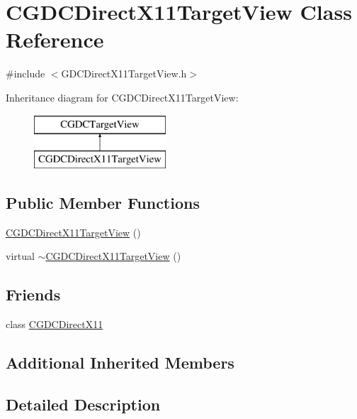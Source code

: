 \hypertarget{class_c_g_d_c_direct_x11_target_view}{}\section{C\+G\+D\+C\+Direct\+X11\+Target\+View Class Reference}
\label{class_c_g_d_c_direct_x11_target_view}


{\ttfamily \#include $<$G\+D\+C\+Direct\+X11\+Target\+View.\+h$>$}

Inheritance diagram for C\+G\+D\+C\+Direct\+X11\+Target\+View\+:\begin{figure}[H]
\begin{center}
\leavevmode
\includegraphics[height=2.000000cm]{class_c_g_d_c_direct_x11_target_view}
\end{center}
\end{figure}
\subsection*{Public Member Functions}
\begin{DoxyCompactItemize}
\item 
\hyperlink{class_c_g_d_c_direct_x11_target_view_abee235fd318db9172f3efd392e84f6eb}{C\+G\+D\+C\+Direct\+X11\+Target\+View} ()
\item 
virtual \hyperlink{class_c_g_d_c_direct_x11_target_view_ae1eb1ad2bcb63fe23eaec85dc600b161}{$\sim$\+C\+G\+D\+C\+Direct\+X11\+Target\+View} ()
\end{DoxyCompactItemize}
\subsection*{Friends}
\begin{DoxyCompactItemize}
\item 
class \hyperlink{class_c_g_d_c_direct_x11_target_view_a4bc7a261a74cf14c4f43ce9c65b1f0b4}{C\+G\+D\+C\+Direct\+X11}
\end{DoxyCompactItemize}
\subsection*{Additional Inherited Members}


\subsection{Detailed Description}

